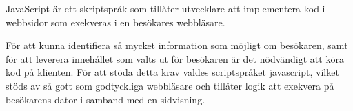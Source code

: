 JavaScript är ett skriptspråk som tillåter utvecklare att implementera kod i webbsidor som exekveras i en besökares webbläsare. 

För att kunna identifiera så mycket information som möjligt om besökaren, samt för att leverera innehållet som valts ut för besökaren är det nödvändigt att köra kod på klienten. För att stöda detta krav valdes scriptspråket javascript, vilket stöds av så gott som godtyckliga webbläsare och tillåter logik att exekvera på besökarens dator i samband med en sidvisning.

